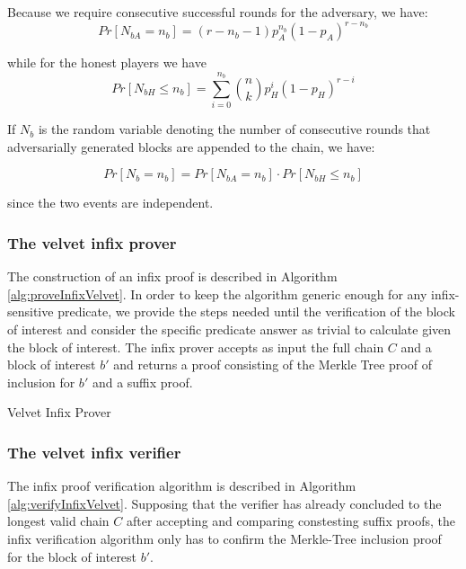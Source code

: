 \documentclass[10pt,a4paper]{article}
\theoremstyle{plain}
\theoremstyle{definition}
\begin{document}
Because we require consecutive successful rounds for the adversary, we have:
\begin{equation}
	Pr[N_{bA} = n_b] = (r-n_b - 1) p_A^{n_b}(1-p_A)^{r-n_b}
\end{equation}

while for the honest players we have 
\begin{equation}
	Pr[N_{bH} \leq n_b] = \sum_{i=0}^{n_b} \binom nk p_H^{i}(1-p_H)^{r-i}
\end{equation}

If $N_b$ is the random variable denoting the number of consecutive rounds that
adversarially generated blocks are appended to the chain, we have:

\begin{equation}
	Pr[N_b = n_b] = Pr[N_{bA} = n_b] \cdot Pr[N_{bH} \leq n_b]
\end{equation}

since the two events are independent.

\subsubsection*{The velvet infix prover}
The construction of an infix proof is described in Algorithm \ref{alg:proveInfixVelvet}. In order
to keep the algorithm generic enough for any infix-sensitive predicate, we provide the steps
needed until the verification of the block of interest and consider the specific predicate answer
as trivial to calculate given the block of interest. The infix prover accepts as input the full
chain $C$ and a block of interest $b'$ and returns a proof consisting of the Merkle Tree proof
of inclusion for $b'$ and a suffix proof.
\vspace{4mm}

\begin{algorithm}[H]
\SetAlgoNoLine
\DontPrintSemicolon
{}
 \caption{Velvet Infix Prover}
 \label{alg:proveInfixVelvet}
\end{algorithm}

\vspace{4mm}

\subsubsection*{The velvet infix verifier}
The infix proof verification algorithm is described in Algorithm \ref{alg:verifyInfixVelvet}.
Supposing that the verifier has already concluded to the longest valid chain $C$ after accepting
and comparing constesting suffix proofs, the infix verification algorithm only has to confirm
the Merkle-Tree inclusion proof for the block of interest $b'$.
\end{document}

